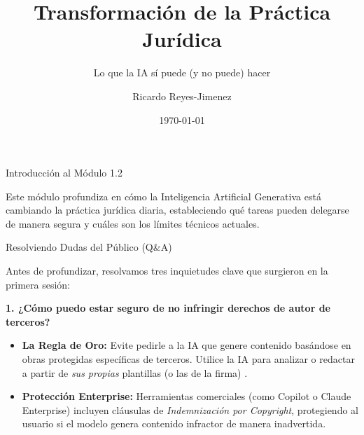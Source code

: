 \documentclass[aspectratio=169]{beamer}
\title[ Transformación de la Práctica]{ Transformación de la Práctica Jurídica}
\subtitle{ Lo que la IA sí puede (y no puede) hacer}
\author{Ricardo Reyes-Jimenez}
\institute{Universidad de La Sabana}
\date{\today}
\begin{document}
\begin{frame}
  \titlepage
\end{frame}

\usebackgroundtemplate{}


\begin{frame}{Introducción al Módulo 1.2}


Este módulo profundiza en cómo la Inteligencia Artificial Generativa está cambiando la práctica jurídica diaria, estableciendo qué tareas pueden delegarse de manera segura y cuáles son los límites técnicos actuales.

\end{frame}

\begin{frame}{Resolviendo Dudas del Público (Q\&A)}


Antes de profundizar, resolvamos tres inquietudes clave que surgieron en la primera sesión:

\textbf{1. ¿Cómo puedo estar seguro de no infringir derechos de autor de terceros?}
\begin{itemize}
  \item \textbf{La Regla de Oro:} Evite pedirle a la IA que genere contenido basándose en obras protegidas específicas de terceros. Utilice la IA para analizar o redactar a partir de \textit{sus propias} plantillas (o las de la firma) \cite{dnda2023}.
  \item \textbf{Protección Enterprise:} Herramientas comerciales (como Copilot o Claude Enterprise) incluyen cláusulas de \textit{Indemnización por Copyright}, protegiendo al usuario si el modelo genera contenido infractor de manera inadvertida.
\end{itemize}
\end{frame}
\end{document}
